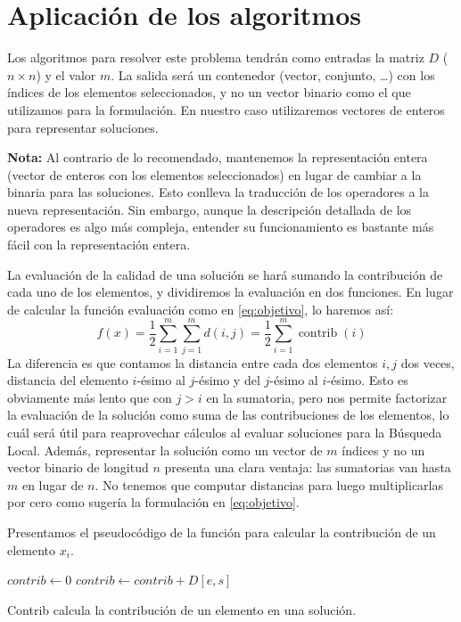 \documentclass{article}
\begin{document}
\pagebreak

\section{Aplicación de los algoritmos}

Los algoritmos para resolver este problema tendrán como entradas la matriz $D$ ($n\times n$) y el valor $m$. La salida será un contenedor
(vector, conjunto, \ldots) con los índices de los elementos seleccionados, y no un vector binario como el que utilizamos para la formulación.
 En nuestro caso utilizaremos vectores de enteros para representar soluciones.

\textbf{Nota:} Al contrario de lo recomendado, mantenemos la representación entera (vector de enteros con los elementos seleccionados) en lugar de cambiar a la binaria para las soluciones.
Esto conlleva la traducción de los operadores a la nueva representación. Sin embargo, aunque la descripción detallada de los operadores es
algo más compleja, entender su funcionamiento es bastante más fácil con la representación entera. 

La evaluación de la calidad de una solución se hará
sumando la contribución de cada uno de los elementos, y dividiremos la evaluación en dos funciones. En lugar de calcular la función evaluación como en
\eqref{eq:objetivo}, lo haremos así:
\begin{equation} \label{eq:objetivo-fact}
f(x)=\frac{1}{2}\sum_{i=1}^{m}\sum_{j=1}^m d(i,j)=\frac{1}{2}\sum_{i=1}^{m}\operatorname{contrib}(i)
\end{equation}
La diferencia es que contamos la distancia entre cada dos elementos $i,j$ dos veces, distancia del elemento $i$-ésimo al $j$-ésimo y del $j$-ésimo al
$i$-ésimo. Esto es obviamente más lento que con $j>i$ en la sumatoria, pero nos permite factorizar la evaluación de la solución como suma de las
 contribuciones de los elementos, lo cuál será útil para reaprovechar cálculos al evaluar soluciones para la Búsqueda Local.
 Además, representar la solución como un vector de $m$ índices y no un vector binario de longitud $n$ presenta una clara ventaja: las sumatorias van hasta
 $m$ en lugar de $n$. No tenemos que computar distancias para luego multiplicarlas por cero como sugería la formulación en \eqref{eq:objetivo}.

Presentamos el pseudocódigo de la función para calcular la contribución de un elemento $x_i$.

\begin{algorithm}[H]
	\DontPrintSemicolon %
	$contrib \gets 0$\;
	 {
		$contrib \gets contrib + D[e,s]$ 
	}
	\;
	\caption{{\sc Contrib} calcula la contribución de un elemento en una solución.}
	\label{alg:contrib}
\end{algorithm}
\end{document}
